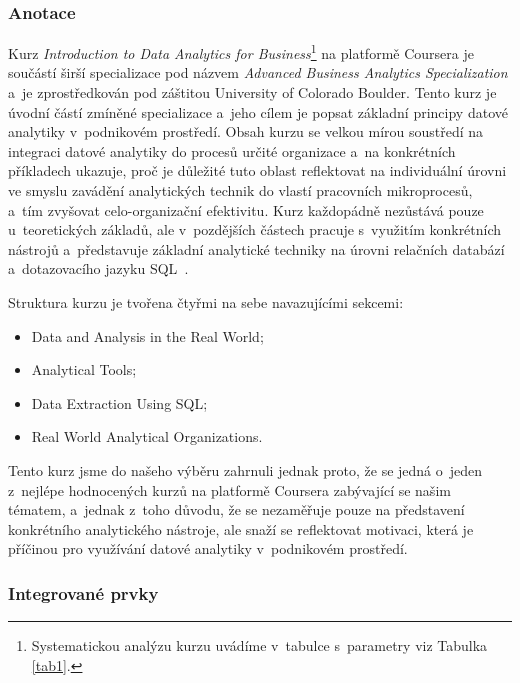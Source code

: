 \hypertarget{anotace}{%
\subsubsection{Anotace}\label{anotace}}

Kurz \emph{Introduction to Data Analytics for Business}\footnote{Systematickou analýzu kurzu uvádíme v~tabulce s~parametry viz Tabulka \ref{tab1}.} na platformě Coursera je součástí širší specializace pod názvem \emph{Advanced Business Analytics Specialization} a~je zprostředkován pod záštitou University of Colorado Boulder. Tento kurz je úvodní částí zmíněné specializace a~jeho cílem je popsat základní principy datové analytiky v~podnikovém prostředí. Obsah kurzu se velkou mírou soustředí na integraci datové analytiky do procesů určité organizace a~na konkrétních příkladech ukazuje, proč je důležité tuto oblast reflektovat na individuální úrovni ve smyslu zavádění analytických technik do vlastí pracovních mikroprocesů, a~tím zvyšovat celo-organizační efektivitu. Kurz každopádně nezůstává pouze u~teoretických základů, ale v~pozdějších částech pracuje s~využitím konkrétních nástrojů a~představuje základní analytické techniky na úrovni relačních databází a~dotazovacího jazyku SQL~\parencite{course1}.

Struktura kurzu je tvořena čtyřmi na sebe navazujícími sekcemi:

\begin{itemize}
\tightlist
\item
  Data and Analysis in the Real World;
\item
  Analytical Tools;
\item
  Data Extraction Using SQL;
\item
  Real World Analytical Organizations.
\end{itemize}

Tento kurz jsme do našeho výběru zahrnuli jednak proto, že se jedná o~jeden z~nejlépe hodnocených kurzů na platformě Coursera zabývající se našim tématem, a~jednak z~toho důvodu, že se nezaměřuje pouze na představení konkrétního analytického nástroje, ale snaží se reflektovat motivaci, která je příčinou pro využívání datové analytiky v~podnikovém prostředí.

\hypertarget{integrovanuxe9-prvky}{%
\subsubsection{Integrované prvky}\label{integrovanuxe9-prvky}}

